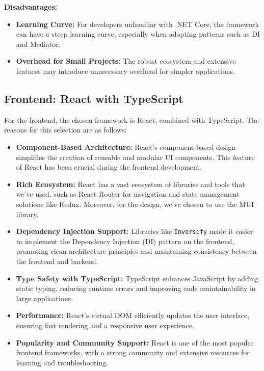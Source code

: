 \textbf{Disadvantages:}
\begin{itemize}
    \item \textbf{Learning Curve:} For developers unfamiliar with .NET Core, the framework can have a steep learning curve, especially when adopting patterns such as DI and Mediator.
    \item \textbf{Overhead for Small Projects:} The robust ecosystem and extensive features may introduce unnecessary overhead for simpler applications.
\end{itemize}

\subsection{Frontend: React with TypeScript}
For the frontend, the chosen framework is React, combined with TypeScript. The reasons for this selection are as follows:

\begin{itemize}
    \item \textbf{Component-Based Architecture:} React's component-based design simplifies the creation of reusable and modular UI components. This feature of React has been crucial during the frontend development.
    
    \item \textbf{Rich Ecosystem:} React has a vast ecosystem of libraries and tools that we've used, such as React Router for navigation and state management solutions like Redux. Moreover, for the design, we've chosen to use the MUI library.

    \item \textbf{Dependency Injection Support:} Libraries like \texttt{Inversify} made it easier to implement the Dependency Injection (DI) pattern on the frontend, promoting clean architecture principles and maintaining consistency between the frontend and backend.

    \item \textbf{Type Safety with TypeScript:} TypeScript enhances JavaScript by adding static typing, reducing runtime errors and improving code maintainability in large applications.
    
    \item \textbf{Performance:} React's virtual DOM efficiently updates the user interface, ensuring fast rendering and a responsive user experience.

    \item \textbf{Popularity and Community Support:} React is one of the most popular frontend frameworks, with a strong community and extensive resources for learning and troubleshooting.
\end{itemize}


